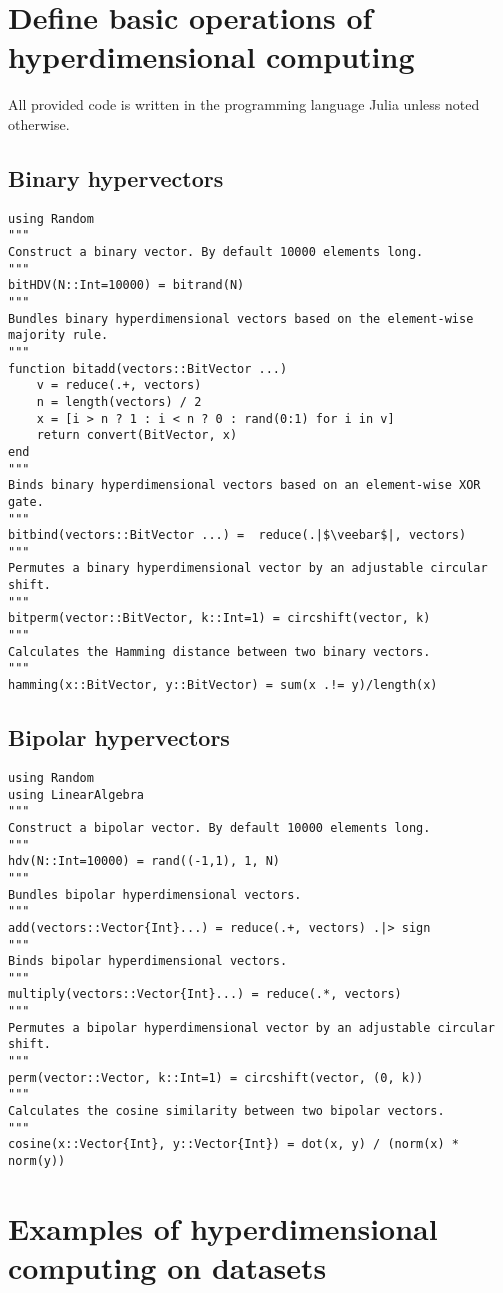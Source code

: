 \chapter{Define basic operations of hyperdimensional computing}
All provided code is written in the programming language Julia unless noted otherwise.
\section{Binary hypervectors}
\begin{verbatim}
using Random
"""
Construct a binary vector. By default 10000 elements long.
"""
bitHDV(N::Int=10000) = bitrand(N)
"""
Bundles binary hyperdimensional vectors based on the element-wise majority rule.
"""
function bitadd(vectors::BitVector ...)
    v = reduce(.+, vectors)
    n = length(vectors) / 2
    x = [i > n ? 1 : i < n ? 0 : rand(0:1) for i in v]
    return convert(BitVector, x)
end
"""
Binds binary hyperdimensional vectors based on an element-wise XOR gate.
"""
bitbind(vectors::BitVector ...) =  reduce(.|$\veebar$|, vectors)
"""
Permutes a binary hyperdimensional vector by an adjustable circular shift.
"""
bitperm(vector::BitVector, k::Int=1) = circshift(vector, k)
"""
Calculates the Hamming distance between two binary vectors.
"""
hamming(x::BitVector, y::BitVector) = sum(x .!= y)/length(x)
\end{verbatim}
\section{Bipolar hypervectors}
\begin{verbatim}
using Random
using LinearAlgebra
"""
Construct a bipolar vector. By default 10000 elements long.
"""
hdv(N::Int=10000) = rand((-1,1), 1, N)
"""
Bundles bipolar hyperdimensional vectors.
"""
add(vectors::Vector{Int}...) = reduce(.+, vectors) .|> sign
"""
Binds bipolar hyperdimensional vectors.
"""
multiply(vectors::Vector{Int}...) = reduce(.*, vectors)
"""
Permutes a bipolar hyperdimensional vector by an adjustable circular shift.
"""
perm(vector::Vector, k::Int=1) = circshift(vector, (0, k))
"""
Calculates the cosine similarity between two bipolar vectors.
"""
cosine(x::Vector{Int}, y::Vector{Int}) = dot(x, y) / (norm(x) * norm(y))
\end{verbatim}
\chapter{Examples of hyperdimensional computing on datasets}

